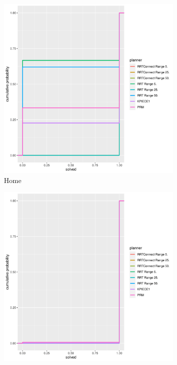 \documentclass[11pt]{article}
\begin{document}
\begin{enumerate}[leftmargin=0.3in]
\begin{enumerate}[leftmargin=0.3in]
       \begin{figure}[H]
          \centering
          \begin{subfigure}[b]{0.3\textwidth}
             \centering
             \includegraphics[width=\textwidth]{figures/home_solved-1.png}
             \caption{Home}
           \end{subfigure}
           \begin{subfigure}[b]{0.3\textwidth}
              \centering
              \includegraphics[width=\textwidth]{figures/twistycool_solved-1.png}

\end{subfigure}
\end{figure}
\end{enumerate}
\end{enumerate}
\end{document}
